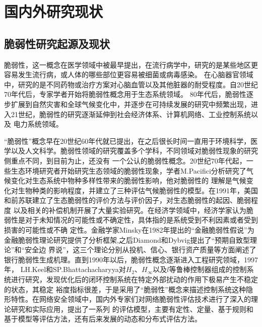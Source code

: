 \section{国内外研究现状}
\label{sec:research_presentSituation}

\subsection{脆弱性研究起源及现状}
\label{sec:origin}
脆弱性，这一概念在医学领域中被最早提出，在流行病学\cite{refs2,refs3}中，研究的是某些地区更容易发生流行病，或人体的哪些部位更容易被细菌或病毒感染。
在心脑器官领域中，研究的是不同药物或治疗方案对心脑血管以及其他脏器的耐受程度\cite{refs4,refs5}。自20世纪70年代后，专家学者开始将脆弱性概念用于生态系统领域\cite{refs6,refs7}。
80年代后，脆弱性逐步扩展到自然灾害和全球气候变化中，并逐步在可持续发展的研究中频繁出现，进入21世纪，脆弱性的研究逐渐延伸到社会经济体系、计算机网络、工业控制系统以及
电力系统领域。

“脆弱性”概念早在20世纪60年代就已提出，在之后很长时间一直用于环境科学，医学以及人文科学。脆弱性领域的研究覆盖多个学科，不同领域对脆弱性现象的研究侧重点不同，到目前为止，还没有
一个公认的脆弱性概念。20世纪70年代起，一些生态环境研究者开始研究生态领域的脆弱性现象，学者M.Pacifici分析研究了气候变化对生态系统中物种多样性带来的脆弱性影响，他对脆弱性的
理解是气候变化对生物种类的影响程度，并建立了三种评估气候脆弱性的模型\cite{refs8}。在1991年，美国和前苏联建立了生态脆弱性的评价方法与评价因子，对生态脆弱性的起因、脆弱程度
以及相关的补偿机制开展了大量实验研究\cite{refs9}。在经济学领域中，经济学家认为脆弱性是对于未知情况的可能性或不确定性，具体指的是系统受到不利因素或者受到损害的可能性或不确
定性\cite{refs10,refs11}。金融学家Minsky在1982年提出的“金融脆弱性假说”为金融脆弱性理论研究提供了分析框架\cite{refs12},之后Diamond和Dybvig提出了“预期自致型理论”和“安全边
界说”\cite{refs13}，这三个理论分别从投机、信心、银行资产质量等方面阐述了银行脆弱性生成机理。直到1990年以后，脆弱性概念逐渐进入工程研究领域，1997年，
LH.Keel和SP.Bhattachacharyya对$H_{2}$、$H_{\infty}$以及$l$等鲁棒控制器组成的控制系统进行研究，发现优化后的闭环控制系统在特定外部扰动的作用下极易产生不稳定的状态，其稳定
裕度指标很差，于是采用了“脆弱性”概念来描述控制系统这种隐形特性\cite{refs14}。在网络安全领域中，国内外专家们对网络脆弱性评估技术进行了深入的理论研究和实际应用，提出了一系列
的评估模型，主要有定性、定量、基于规则和基于模型等评估方法，还有后来发展的动态和分布式评估方法\cite{refs15,refs16}。

